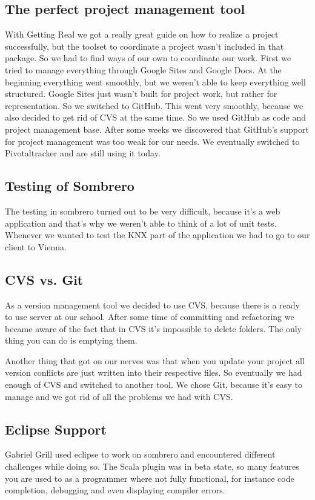 \subsection{The perfect project management tool}
    With Getting Real we got a really great guide on how to realize a project successfully, but the toolset to coordinate a project wasn't included in that package. So we had to find ways of our own to coordinate our work. First we tried to manage everything through Google Sites and Google Docs. At the beginning everything went smoothly, but we weren't able to keep everything well structured. Google Sites just wasn't built for project work, but rather for representation. So we switched to GitHub. This went very smoothly, because we also decided to get rid of CVS at the same time. So we used GitHub as code and project management base. After some weeks we discovered that GitHub's support for project management was too weak for our needs. We eventually switched to Pivotaltracker and are still using it today.
\subsection{Testing of Sombrero}
    The testing in sombrero turned out to be very difficult, because it's a web application and that's why we weren't able to think of a lot of unit tests. Whenever we wanted to test the KNX part of the application we had to go to our client to Vienna.
\subsection{CVS vs. Git}
    As a version management tool we decided to use CVS, because there is a ready to use server at our school. After some time of committing and refactoring we became aware of the fact that in CVS it's impossible to delete folders. The only thing you can do is emptying them.

    Another thing that got on our nerves was that when you update your project all version conflicts are just written into their respective files. So eventually we had enough of CVS and switched to another tool. We chose Git, because it's easy to manage and we got rid of all the problems we had with CVS.
\subsection{Eclipse Support}
    Gabriel Grill used eclipse to work on sombrero and encountered different challenges while doing so. The Scala plugin was in beta state, so many features you are used to as a programmer where not fully functional, for instance code completion, debugging and even displaying compiler errors.


